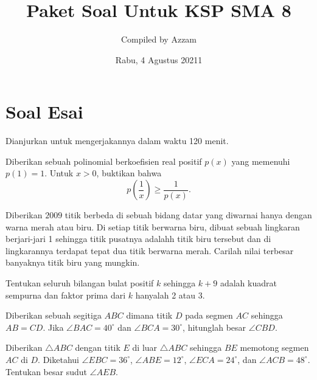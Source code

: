 \documentclass[11pt]{scrartcl}
\begin{document}
	\title{Paket Soal Untuk KSP SMA 8} %
	\date{Rabu, 4 Agustus 20211}
	\author{Compiled by Azzam}
	\maketitle
	
	
	\section{Soal Esai}
	Dianjurkan untuk mengerjakannya dalam waktu 120 menit.
	
		
		
		\begin{soalbaru}
				Diberikan sebuah polinomial berkoefisien real positif $p(x)$ yang memenuhi $p(1)=1$. Untuk $x > 0$, buktikan bahwa $$p\left(\dfrac{1}{x}\right) \ge \dfrac{1}{p(x)}.$$
			\end{soalbaru}

	\begin{soalbaru}
		Diberikan $2009$ titik berbeda di sebuah bidang datar yang diwarnai hanya dengan warna merah atau biru. Di setiap titik berwarna biru, dibuat sebuah lingkaran berjari-jari 1 sehingga titik pusatnya adalahh titik biru tersebut dan di lingkarannya terdapat tepat dua titik berwarna merah. Carilah nilai terbesar banyaknya titik biru yang mungkin.
		
	\end{soalbaru}

	\begin{soalbaru}
		Tentukan seluruh bilangan bulat positif $k$ sehingga $k+9$ adalah kuadrat sempurna dan faktor prima dari $k$ hanyalah 2 atau 3.
		
	\end{soalbaru}

	
	\begin{soalbaru}
	
	Diberikan sebuah segitiga $ABC$ dimana titik $D$ pada segmen $AC$ sehingga $AB=CD$. Jika $\angle BAC = 40^\circ$ dan $\angle BCA = 30^\circ$, hitunglah besar $\angle CBD$.
	\end{soalbaru}

\begin{soalbaru} 
			Diberikan $\triangle ABC$ dengan titik $E$ di luar $\triangle ABC$ sehingga $BE$ memotong segmen $AC$ di $D$. Diketahui $\angle EBC = 36^\circ$, $\angle ABE = 12^\circ$, $\angle ECA = 24^\circ$, dan $\angle ACB = 48^\circ$. Tentukan besar sudut $\angle AEB$.
		\end{soalbaru}
	
\end{document}
